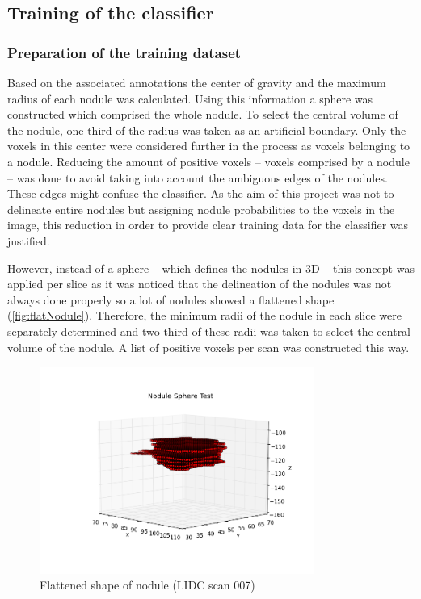 \subsection{Training of the classifier}
\subsubsection{Preparation of the training dataset}
Based on the associated annotations the center of gravity and the maximum radius
of each nodule was calculated. Using this information a sphere was constructed
which comprised the whole nodule. To select the central volume of the nodule,
one third of the radius was taken as an artificial boundary. Only the voxels in
this center were considered further in the process as voxels belonging to a
nodule. Reducing the amount of positive voxels -- voxels comprised by a nodule
-- was done to avoid taking into account the ambiguous edges of the nodules.
These edges might confuse the classifier. As the aim of this project was not to
delineate entire nodules but assigning nodule probabilities to the voxels in
the image, this reduction in order to provide clear training data for the
classifier was justified.

However, instead of a sphere -- which defines the nodules in 3D -- this concept
was applied per slice as it was noticed that the delineation of the nodules was
not always done properly so a lot of nodules showed a flattened shape
(\autoref{fig:flatNodule}).
Therefore, the minimum radii of the nodule in each slice were separately
determined and two third of these radii was taken to select the central volume
of the nodule. A list of positive voxels per scan was constructed this way.
\begin{figure}[htp]
 \begin{center}
    \includegraphics[width=90mm]{img/spherenodule_001.png}
    \caption{Flattened shape of nodule (LIDC scan 007)}
    \label{fig:flatNodule}
 \end{center}
\end{figure} %

